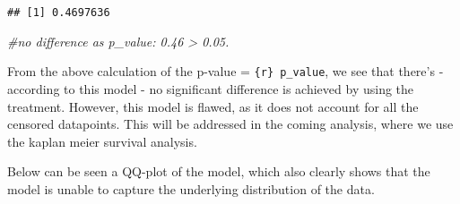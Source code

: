 \documentclass[
]{article}
\newenvironment{Shaded}{\begin{snugshade}}{\end{snugshade}}
\newcommand{\AttributeTok}[1]{\textcolor[rgb]{0.77,0.63,0.00}{#1}}
\newcommand{\CommentTok}[1]{\textcolor[rgb]{0.56,0.35,0.01}{\textit{#1}}}
\newcommand{\DecValTok}[1]{\textcolor[rgb]{0.00,0.00,0.81}{#1}}
\newcommand{\FunctionTok}[1]{\textcolor[rgb]{0.00,0.00,0.00}{#1}}
\newcommand{\NormalTok}[1]{#1}
\newcommand{\OtherTok}[1]{\textcolor[rgb]{0.56,0.35,0.01}{#1}}
\newcommand{\SpecialCharTok}[1]{\textcolor[rgb]{0.00,0.00,0.00}{#1}}
\newcommand{\StringTok}[1]{\textcolor[rgb]{0.31,0.60,0.02}{#1}}
\begin{document}
\begin{Shaded}
\end{Shaded}

\begin{verbatim}
## [1] 0.4697636
\end{verbatim}

\begin{Shaded}
\begin{Highlighting}[]
\CommentTok{\#no difference as p\_value: 0.46 \textgreater{} 0.05.}
\end{Highlighting}
\end{Shaded}

From the above calculation of the p-value = \texttt{\{r\}\ p\_value}, we
see that there's - according to this model - no significant difference
is achieved by using the treatment. However, this model is flawed, as it
does not account for all the censored datapoints. This will be addressed
in the coming analysis, where we use the kaplan meier survival analysis.

Below can be seen a QQ-plot of the model, which also clearly shows that
the model is unable to capture the underlying distribution of the data.

\begin{Shaded}
\end{Shaded}
\end{document}
